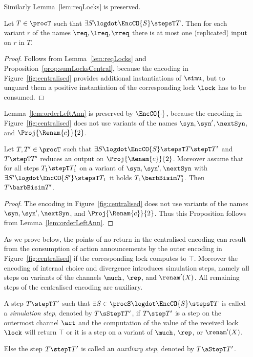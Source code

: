 \documentclass[]{eptcs}
\begin{document}
Similarly Lemma~\ref{lem:reqLocks} is preserved.

\begin{prop}
	Let $ T \in \procT $ such that $ \exists S\logdot \EncCO{S} \stepsT T $. Then for each variant $ r $ of the names $ \req, \lreq, \rreq $ there is at most one (replicated) input on $ r $ in $ T $.
	\label{prop:reqLocksCentral}
\end{prop}

\begin{proof}
	Follows from Lemma~\ref{lem:reqLocks} and Proposition~\ref{prop:sumLocksCentral}, because the encoding in Figure~\ref{fig:centralised} provides additional instantiations of $ \simu $, but to unguard them a positive instantiation of the corresponding lock $ \lock $ has to be consumed.
\end{proof}

Lemma~\ref{lem:orderLeftAnn} is preserved by $ \EncCO{\cdot} $, because the encoding in Figure~\ref{fig:centralised} does not use variants of the names $ \syn, \syn', \nextSyn $, and $ \Proj{\Renam{c}}{2} $.

\begin{prop}
	Let $ T, T' \in \procT $ such that $ \exists S\logdot \EncCO{S} \stepsT T \stepT T' $ and $ T \stepT T' $ reduces an output on $ \Proj{\Renam{c}}{2} $. Moreover assume that for all steps $ T_1 \stepT T_1' $ on a variant of $ \syn, \syn', \nextSyn $ with $ \exists S'\logdot \EncCO{S'} \stepsT T_1 $ it holds $ T_1 \barbBisim T_1' $.
	Then $ T \barbBisim T' $.
	\label{prop:orderLeftAnnCentral}
\end{prop}

\begin{proof}
	The encoding in Figure~\ref{fig:centralised} does not use variants of the names $ \syn, \syn', \nextSyn $, and $ \Proj{\Renam{c}}{2} $. Thus this Proposition follows from Lemma~\ref{lem:orderLeftAnn}.
\end{proof}

As we prove below, the points of no return in the centralised encoding can result from the consumption of action announcements by the outer encoding in Figure~\ref{fig:centralised} if the corresponding lock computes to $ \top $. Moreover the encoding of internal choice and divergence introduces simulation steps, namely all steps on variants of the channels $ \much $, $ \rep $, and $ \renam'(X) $. All remaining steps of the centralised encoding are auxiliary.

\begin{definition}
	A step $ T \stepT T' $ such that $ \exists S \in \procS\logdot \EncCO{S} \stepsT T $ is called a \emph{simulation step}, denoted by $ T \sStepT T' $, if $ T \step T' $ is a step on the outermost channel $ \act $ and the computation of the value of the received lock $ \lock $ will return $ \top $ or it is a step on a variant of $ \much $, $ \rep $, or $ \renam'(X) $.
	
	Else the step $ T \stepT T' $ is called an \emph{auxiliary step}, denoted by $ T \aStepT T' $.
	\label{def:auxStepsCentral}
\end{definition}
\end{document}
